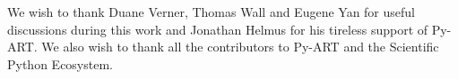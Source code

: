 \documentclass[twocol]{ametsoc}
\begin{document}
 We wish to thank Duane Verner, Thomas Wall and Eugene Yan for useful discussions during this work and Jonathan Helmus for his tireless support 
 of Py-ART. We also wish to thank all the contributors to Py-ART and the Scientific Python Ecosystem. 
%
%
%







\end{document}
